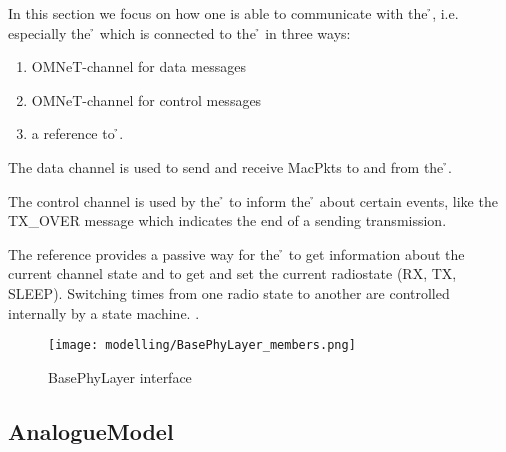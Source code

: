 In this section we focus on how one is able to communicate with the 
\h{\bp}, i.e. especially the \h{\bm} which is connected to the \h{\bp}
in three ways:

\begin{enumerate}
 \item OMNeT-channel for data messages
 \item OMNeT-channel for control messages
 \item a reference to \h{\bp}.
\end{enumerate} 

The data channel is used to send and receive MacPkts to and
from the \h{\bp}.

The control channel is used by the \h{\bp} to inform the \h{\bm} about
certain events, like the TX\_OVER message 
which indicates the end of a sending transmission.

The reference provides a passive way for the  \h{\bm} to  get
information about the current channel state and to
get and set the current radiostate (RX, TX,
SLEEP).
Switching times from one radio state to another are controlled
internally by a state machine. .


\begin{figure}[H]
 \centering
 \texttt{[image: modelling/BasePhyLayer\_members.png]}
 \caption{BasePhyLayer interface}
 \label{fig: BasePhyLayer interface}
\end{figure}



\subsection{AnalogueModel}




